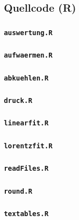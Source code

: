 \documentclass[12pt]{article}
\newcommand{\code}[1]{\texttt{#1}}
\begin{document}
%
\clearpage
\subsection{Quellcode (R)}
\subsubsection{\code{auswertung.R}}\label{auswertungR}

\subsubsection{\code{aufwaermen.R}}\label{aufwaermenR}

\subsubsection{\code{abkuehlen.R}}\label{abkuehlenR}

\subsubsection{\code{druck.R}}\label{druckR}

\subsubsection{\code{linearfit.R}}\label{linearfitR}

\subsubsection{\code{lorentzfit.R}}\label{lorentzfitR}

\subsubsection{\code{readFiles.R}}\label{readFilesR}

\subsubsection{\code{round.R}}\label{roundR}

\subsubsection{\code{textables.R}}\label{textablesR}

\end{document}
